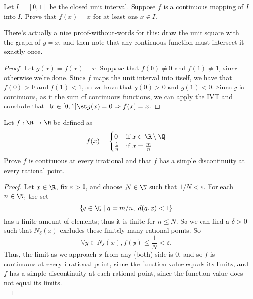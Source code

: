 \documentclass{assignment}
\begin{document}
\begin{question}[4.13*]
  
\end{question}

\begin{question}[4.14*]
 Let $I = [0,1]$ be the closed unit interval. Suppose $f$ is a continuous mapping of $I$ into $I$.
Prove that $f(x) = x$ for at least one $x\in I$. 
\end{question}
There's actually a nice proof-without-words for this: draw the unit square with the graph of $y=x$,
and then note that any continuous function must intersect it exactly once. 
\begin{proof}
  Let $g(x) = f(x) - x$. Suppose that $f(0) \neq 0$ and $f(1) \neq 1$, since otherwise we're
done. Since $f$ maps the unit interval into itself, we have that $f(0) > 0$ and $f(1) < 1$, so we
have that $g(0) > 0$ and $g(1) < 0$. Since $g$ is continuous, as it the sum of continuous functions,
we can apply the IVT and conclude that $\exists x\in [0,1] \st g(x) = 0 \Rightarrow f(x) = x.$
\end{proof}

\begin{question}[4.18]
 Let $f: \R \to \R$ be defined as 
$$ f(x) = \begin{cases} 0 &\text{if $x\in\R\setminus\Q$} \\ \frac{1}{n} &\text{if $x = \frac{m}{n}$}
\end{cases}$$
 Prove $f$ is continuous at every irrational and that $f$ has a simple discontinuity at every 
rational point. 
\end{question}
\begin{proof}
Let $x\in\R$, fix $\varepsilon > 0$, and choose $N\in\N$ such that $1/N < \varepsilon$. For each
$n\in\N,$ the set $$\{ q\in\Q \mid q = m/n,\ d(q,x) < 1 \}$$ has a finite amount of elements; 
thus it is finite for $n\leq N$. So we can find a $\delta > 0$ such that $N_\delta(x)$ excludes these
finitely many rational points. So $$\forall y \in N_\delta(x), f(y) \leq \frac{1}{N} < \varepsilon.$$
Thus, the limit as we approach $x$ from any (both) side is 0, and so $f$ is continuous at every
irrational point, since the function value equals its limits, and $f$ has a simple discontinuity at
each rational point, since the function value does not equal its limits. \\
\end{proof}
\end{document}
